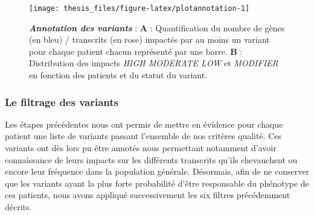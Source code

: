 \documentclass[12pt,a4paper,twoside]{ugathesis}
\theoremstyle{definition}
\theoremstyle{definition}
\theoremstyle{definition}
\theoremstyle{remark}
\begin{document}
\newpage

\begin{figure}

{\centering \texttt{[image: thesis\_files/figure-latex/plotannotation-1]} 

}

\caption[Annotation des variants]{\textbf{\emph{Annotation des variants}} :
\textbf{A} : Quantification du nombre de gènes (en bleu) / transcrits
(en rose) impactés par au moins un variant pour chaque patient chacun
représenté par une barre. \textbf{B} : Distribution des impacts
\emph{HIGH MODERATE LOW} et \emph{MODIFIER} en fonction des patients et
du statut du variant.}\label{fig:plotannotation}
\end{figure}








\subsubsection{Le filtrage des
variants}\label{le-filtrage-des-variants-2}

Les étapes précédentes nous ont permis de mettre en évidence pour chaque
patient une liste de variants passant l'ensemble de nos critères
qualité. Ces variants ont dès lors pu être annotés nous permettant
notamment d'avoir connaissance de leurs impacts sur les différents
transcrits qu'ils chevauchent ou encore leur fréquence dans la
population générale. Désormais, afin de ne conserver que les variants
ayant la plus forte probabilité d'être responsable du phénotype de ces
patients, nous avons appliqué successivement les six filtres
précédemment décrits.
\end{document}
